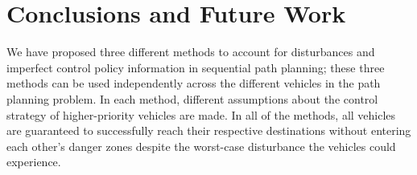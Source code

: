 \section{Conclusions and Future Work}
We have proposed three different methods to account for disturbances and imperfect control policy information in sequential path planning; these three methods can be used independently across the different vehicles in the path planning problem. In each method, different assumptions about the control strategy of higher-priority vehicles are made. In all of the methods, all vehicles are guaranteed to successfully reach their respective destinations without entering each other's danger zones despite the worst-case disturbance the vehicles could experience. %